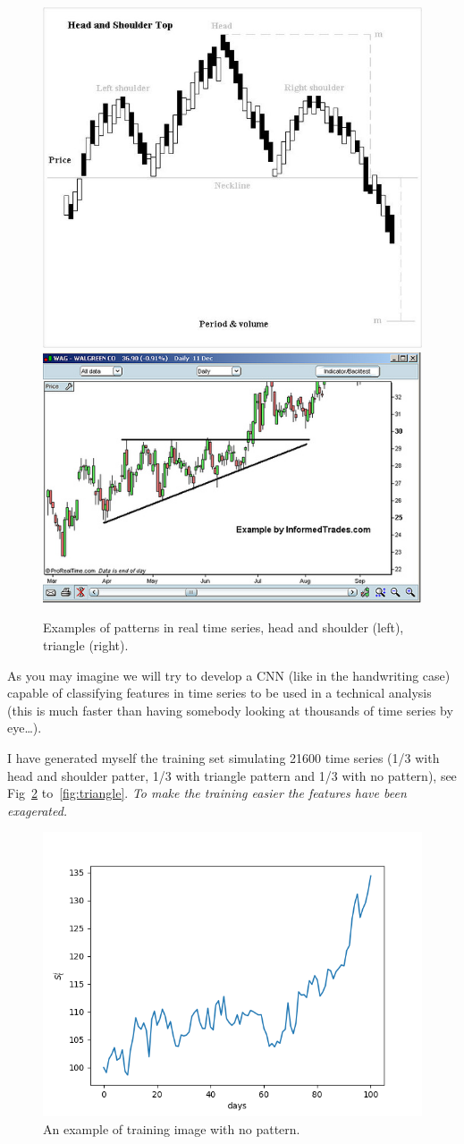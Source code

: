 \begin{figure}[htb]
	\centering
	\includegraphics[width=0.4\linewidth]{figures/H_and_s_top_new.jpg}\qquad
	\includegraphics[width=0.4\linewidth]{figures/Triangle-ascending.jpg}
	\caption{Examples of patterns in real time series, head and shoulder (left), triangle (right).}
        \label{fig:tech_ana}
\end{figure}

As you may imagine we will try to develop a CNN (like in the handwriting
case) capable of classifying features in time series to be used in a
technical analysis (this is much faster than having somebody looking at
thousands of time series by eye\ldots{}).

I have generated myself the training set simulating 21600 time series
(1/3 with head and shoulder patter, 1/3 with triangle pattern and 1/3
with no pattern), see Fig~\ref{fig:no_pattern} to~\ref{fig:triangle}.
\emph{To make the training easier the features have been exagerated.}

\begin{figure}
	\centering
	\includegraphics[width=0.5\linewidth]{figures/image_1.png}
	\caption{An example of training image with no pattern.}
        \label{fig:no_pattern}
\end{figure}

